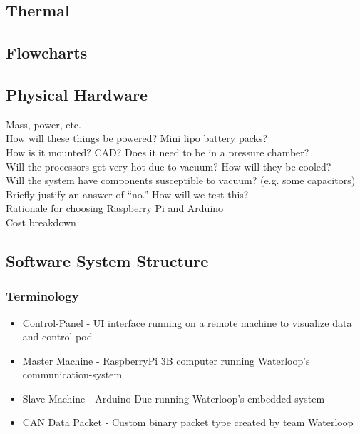 \documentclass{report}
\begin{document}
    \subsection{Thermal}
    \subsection{Flowcharts}
    
    \subsection{Physical Hardware}
    Mass, power, etc.\\
    How will these things be powered? Mini lipo battery packs?\\
    How is it mounted? CAD? Does it need to be in a pressure chamber?\\
    Will the processors get very hot due to vacuum? How will they be cooled?\\
    Will the system have components susceptible to vacuum? (e.g. some capacitors) Briefly justify an answer of “no.” How will we test this?\\
    Rationale for choosing Raspberry Pi and Arduino\\
    Cost breakdown
    
    \subsection{Software System Structure}
    \subsubsection{Terminology}
    \begin{itemize}
        \item Control-Panel - UI interface running on a remote machine to visualize data and control pod
        \item Master Machine - RaspberryPi 3B computer running Waterloop’s communication-system
        \item Slave Machine - Arduino Due running Waterloop’s embedded-system
        \item CAN Data Packet - Custom binary packet type created by team Waterloop
    \end{itemize}
\end{document}
